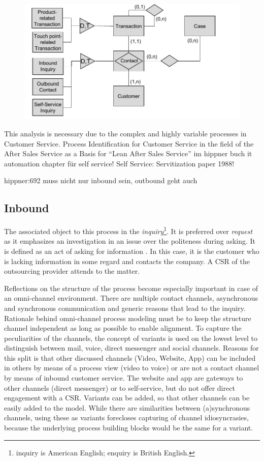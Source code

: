	 \begin{figure}[caption={\acrshort{ERM} of customer-facing services}, label={fig:contacterm}]
	 	{	\includegraphics[width=.8\textwidth]{figures/contacterm.pdf}}
	 \end{figure} 
	 
	 
	 This analysis is necessary due to the complex and highly variable processes in Customer Service. Process Identification for Customer Service in the field of the After Sales Service as a Basis for “Lean After Sales Service”
	 im hippner buch it automation chapter für self service!
	 Self Service: Servitization paper 1988!
	 
	 hippner:692 muss nicht nur inbound sein, outbound geht auch
	 
	 \subsection{Inbound}
	 The associated object to this process in the \textit{inquiry}\footnote{inquiry is American English; enquiry is British English.}. It is preferred over \textit{request} as it emphasizes an investigation in an issue over the politeness during asking. It is defined as an act of asking for information \citep{oxfordenquiry, oxfordrequest}. In this case, it is the customer who is lacking information in some regard and contacts the company. A \acrshort{CSR} of the outsourcing provider attends to the matter. 
	 
	 Reflections on the structure of the process become especially important in case of an omni-channel environment. There are multiple contact channels, asynchronous and synchronous communication and generic reasons that lead to the inquiry. Rationale behind omni-channel process modeling must be to keep the structure channel independent as long as possible to enable alignment. To capture the peculiarities of the channels, the concept of variants is used on the lowest level to distinguish between mail, voice, direct messenger and social channels. Reasons for this split is that other discussed channels (Video, Website, App) can be included in others by means of a process view (video to voice) or are not a contact channel by means of inbound customer service. The website and app are gateways to other channels (direct messenger) or to self-service, but do not offer direct engagement with a \acrshort{CSR}. Variants can be added, so that other channels can be easily added to the model. While there are similarities between (a)synchronous channels, using these as variants forecloses capturing of channel idiosyncrasies, because the underlying process building blocks would be the same for a variant. 
	 
